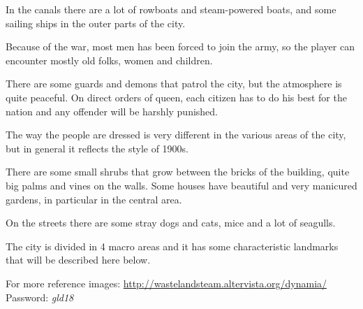 In the canals there are a lot of rowboats and steam-powered boats, and some sailing ships in the outer parts of the city.

Because of the war, most men has been forced to join the army, so the player can encounter mostly old folks, women and children.

There are some guards and demons that patrol the city, but the atmosphere is quite peaceful. On direct orders of queen, each citizen has to do his best for the nation and any offender will be harshly punished.

The way the people are dressed is very different in the various areas of the city, but in general it reflects the style of 1900s.

There are some small shrubs that grow between the bricks of the building, quite big palms and vines on the walls. Some houses have beautiful and very manicured gardens, in particular in the central area.

On the streets there are some stray dogs and cats, mice and a lot of seagulls.

The city is divided in 4 macro areas and it has some characteristic landmarks that will be described here below.

For more reference images: \url{http://wastelandsteam.altervista.org/dynamia/}\\
Password: \textit{gld18}
